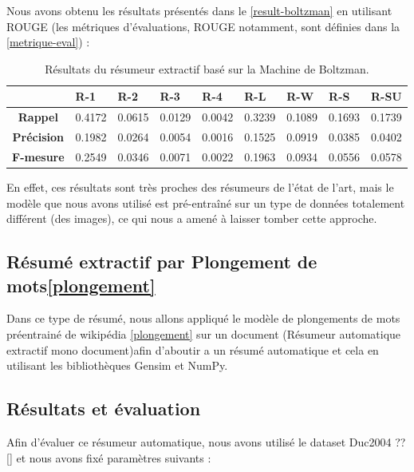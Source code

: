     Nous avons obtenu les résultats présentés dans le \autoref{result-boltzman} en utilisant ROUGE (les métriques d'évaluations, ROUGE notamment, sont définies dans la \autoref{metrique-eval}) : 
    \begin{table}[H]
        \begin{center}
            \begin{tabular}{|c|C{1.2cm}|C{1.2cm}|C{1.2cm}|C{1.2cm}|C{1.2cm}|C{1.2cm}|C{1.2cm}|C{1.2cm}|}
                 & \textbf{R-1} &  \textbf{R-2} &  \textbf{R-3} &  \textbf{R-4} &  \textbf{R-L} &  \textbf{R-W} &  \textbf{R-S} &  \textbf{R-SU} \\
                \hline
                \textbf{Rappel} & 0.4172 & 0.0615 & 0.0129 & 0.0042 & 0.3239 & 0.1089 & 0.1693 & 0.1739 \\
                \textbf{Précision} & 0.1982 & 0.0264 & 0.0054 & 0.0016 & 0.1525 & 0.0919 & 0.0385 & 0.0402 \\
                \textbf{F-mesure} & 0.2549 & 0.0346 & 0.0071 & 0.0022 & 0.1963 & 0.0934 & 0.0556 & 0.0578 \\
                \hline
            \end{tabular}
        \end{center}
        \caption{Résultats du résumeur extractif basé sur la Machine de Boltzman.}
        \label{result-boltzman}
    \end{table}
    En effet, ces résultats sont très proches des résumeurs de l'état de l'art, mais le modèle que nous avons utilisé est pré-entraîné sur un type de données totalement différent (des images), ce qui nous a amené à laisser tomber cette approche.   

\subsection{Résumé extractif par Plongement de mots\ref{plongement}}
Dans ce type de résumé, nous allons appliqué le modèle de plongements de mots préentrainé de wikipédia \ref{plongement} sur un document (Résumeur automatique extractif mono document)\cite{notreresume}afin d'aboutir a un résumé automatique et cela en utilisant les bibliothèques Gensim et NumPy. 

\subsection{Résultats et évaluation}
Afin d'évaluer ce résumeur automatique, nous avons utilisé le dataset Duc2004 ??\autoref{} et nous avons fixé paramètres suivants :

